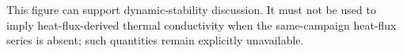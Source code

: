 This figure can support dynamic-stability discussion. It must not be used to imply heat-flux-derived thermal conductivity when the same-campaign heat-flux series is absent; such quantities remain explicitly unavailable.
